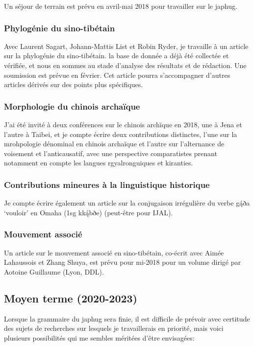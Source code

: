 \documentclass[oldfontcommands,oneside,a4paper,11pt]{article}
\newcommand{\ipa}[1]{{\phon #1}} %
\begin{document}
Un séjour de terrain est prévu en avril-mai 2018 pour travailler sur le japhug.

\subsubsection{Phylogénie du sino-tibétain}
Avec Laurent Sagart, Johann-Mattis List et Robin Ryder, je travaille à un article sur la phylogénie du sino-tibétain. la base de donnée a déjà été collectée et vérifiée, et nous en sommes au stade d'analyse des résultats et de rédaction. Une soumission est prévue en février. Cet article pourra s'accompagner d'autres articles dérivés sur des points plus spécifiques.


\subsubsection{Morphologie du chinois archaïque}
J'ai été invité à deux conférences sur le chinois archïque en 2018, une à Jena et l'autre à Taibei, et je compte écrire deux contributions distinctes, l'une sur la mrohpologie dénominal en chinois archaïque et l'autre sur l'alternance de voisement et l'anticausatif, avec une perspective comparatistes prenant notamment en compte les langues rgyalronguiques et kiranties.

\subsubsection{Contributions mineures à la linguistique historique}
Je compte écrire également un article sur la conjugaison irrégulière du verbe \ipa{gą́ða}  `vouloir' en Omaha (1sg \ipa{kką́bðe}) (peut-être pour IJAL).

\subsubsection{Mouvement associé}
Un article sur le mouvement associé en sino-tibétain, co-écrit avec Aimée Lahaussois et Zhang Shuya, est prévu pour mi-2018 pour un volume dirigé par Aotoine Guillaume (Lyon, DDL).

\subsection{Moyen terme (2020-2023)}
Lorsque la grammaire du japhug sera finie, il est difficile de prévoir avec certitude des sujets de recherches sur lesquels je travaillerais en priorité, mais voici plusieurs possibilités qui me sembles méritées d'être envisagées:
\end{document}
